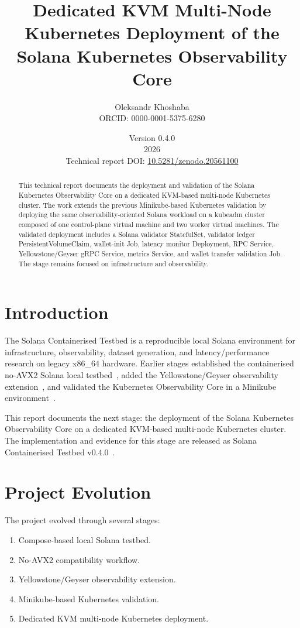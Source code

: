 \documentclass[11pt,a4paper]{article}
\title{Dedicated KVM Multi-Node Kubernetes Deployment of the Solana Kubernetes Observability Core}
\author{Oleksandr Khoshaba\\ORCID: 0000-0001-5375-6280}
\date{Version 0.4.0\\2026\\Technical report DOI: \href{https://doi.org/10.5281/zenodo.20561100}{10.5281/zenodo.20561100}}
\begin{document}
\maketitle

\begin{abstract}
This technical report documents the deployment and validation of the Solana Kubernetes Observability Core on a dedicated KVM-based multi-node Kubernetes cluster. The work extends the previous Minikube-based Kubernetes validation by deploying the same observability-oriented Solana workload on a kubeadm cluster composed of one control-plane virtual machine and two worker virtual machines. The validated deployment includes a Solana validator StatefulSet, validator ledger PersistentVolumeClaim, wallet-init Job, latency monitor Deployment, RPC Service, Yellowstone/Geyser gRPC Service, metrics Service, and wallet transfer validation Job. The stage remains focused on infrastructure and observability.
\end{abstract}

\tableofcontents

\section{Introduction}

The Solana Containerised Testbed is a reproducible local Solana environment for infrastructure, observability, dataset generation, and latency/performance research on legacy x86\_64 hardware. Earlier stages established the containerised no-AVX2 Solana local testbed~\cite{khoshaba_containerising_solana_v010}, added the Yellowstone/Geyser observability extension~\cite{khoshaba_yellowstone_geyser_v020}, and validated the Kubernetes Observability Core in a Minikube environment~\cite{khoshaba_solana_testbed_v030,khoshaba_kubernetes_observability_preprint_v030}.

This report documents the next stage: the deployment of the Solana Kubernetes Observability Core on a dedicated KVM-based multi-node Kubernetes cluster. The implementation and evidence for this stage are released as Solana Containerised Testbed v0.4.0~\cite{khoshaba_solana_testbed_v040}.

\section{Project Evolution}

The project evolved through several stages:

\begin{enumerate}[leftmargin=*]
  \item Compose-based local Solana testbed.
  \item No-AVX2 compatibility workflow.
  \item Yellowstone/Geyser observability extension.
  \item Minikube-based Kubernetes validation.
  \item Dedicated KVM multi-node Kubernetes deployment.
\end{enumerate}
\end{document}
